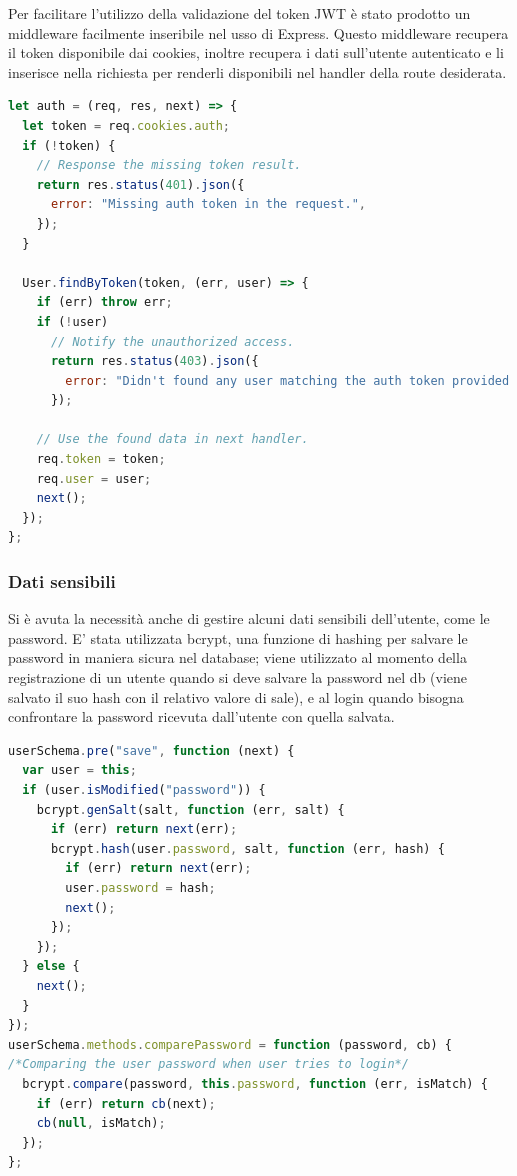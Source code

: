 Per facilitare l'utilizzo della validazione del token JWT è stato prodotto un middleware facilmente inseribile nel 
usso di Express. Questo middleware recupera il token disponibile dai cookies, inoltre recupera i dati sull'utente
autenticato e li inserisce nella richiesta per renderli disponibili nel handler della
route desiderata.
\begin{lstlisting}[language=Javascript]
let auth = (req, res, next) => {
  let token = req.cookies.auth;
  if (!token) {
    // Response the missing token result.
    return res.status(401).json({
      error: "Missing auth token in the request.",
    });
  }

  User.findByToken(token, (err, user) => {
    if (err) throw err;
    if (!user)
      // Notify the unauthorized access.
      return res.status(403).json({
        error: "Didn't found any user matching the auth token provided.",
      });

    // Use the found data in next handler.
    req.token = token;
    req.user = user;
    next();
  });
};

\end{lstlisting}
\subsubsection{Dati sensibili}
Si è avuta la necessità anche di gestire alcuni dati sensibili dell'utente, come le password. E' stata utilizzata bcrypt, una funzione di hashing per salvare le password in maniera sicura
nel database; viene utilizzato al momento della registrazione di un utente
quando si deve salvare la password nel db (viene salvato il suo hash con il
relativo valore di sale), e al login quando bisogna confrontare la password
ricevuta dall’utente con quella salvata. 
\begin{lstlisting}[language=Javascript]
userSchema.pre("save", function (next) {
  var user = this;
  if (user.isModified("password")) {
    bcrypt.genSalt(salt, function (err, salt) {
      if (err) return next(err);
      bcrypt.hash(user.password, salt, function (err, hash) {
        if (err) return next(err);
        user.password = hash;
        next();
      });
    });
  } else {
    next();
  }
});
userSchema.methods.comparePassword = function (password, cb) {
/*Comparing the user password when user tries to login*/
  bcrypt.compare(password, this.password, function (err, isMatch) {
    if (err) return cb(next);
    cb(null, isMatch);
  });
};
\end{lstlisting}


